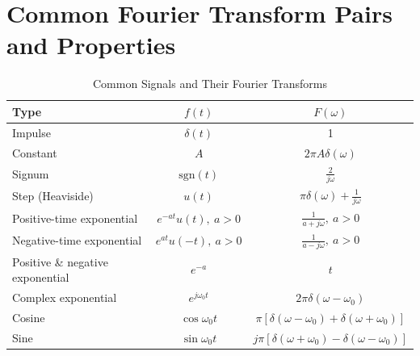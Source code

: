 \documentclass{article}
\begin{document}
\section{Common Fourier Transform Pairs and Properties}
\begin{table}[H]
    \centering
    \caption{Common Signals and Their Fourier Transforms}
    \label{tab:a3-t1}
    \begin{tabular}{l|c|c}
        Type & $f(t)$ & $F(\omega )$ \\ 
        \hline
        \hline
        Impulse & $\delta (t)$ & 1 \\
        Constant & $A$ & $2\pi A\delta (\omega )$ \\
        Signum & $\text{sgn}(t)$ & $\frac{2}{j\omega }$ \\
        Step (Heaviside) & $u(t)$ & $\pi \delta (\omega )+\frac{1}{j\omega }$ \\
        Positive-time exponential & $e^{-at}u(t),\ a>0$ & $\frac{1}{a+j\omega },\ a>0$ \\
        Negative-time exponential & $e^{at}u(-t),\ a>0$ & $\frac{1}{a-j\omega },\ a>0$ \\
        Positive \& negative exponential & $e^{-a}$ & $t$ \\
        Complex exponential & $e^{j\omega _0t}$ & $2\pi \delta (\omega -\omega _0)$ \\
        Cosine & $\cos\omega _0t$ & $\pi \left[ \delta (\omega -\omega _0) +\delta (\omega +\omega _0)\right]$ \\
        Sine & $\sin\omega _0t$ & $j\pi \left[ \delta (\omega +\omega _0) -\delta (\omega -\omega _0)\right]$
    \end{tabular}
\end{table}
\end{document}
